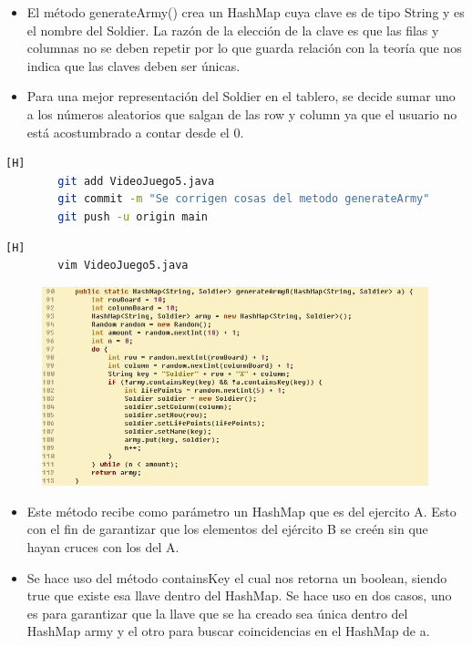 \documentclass{article}
\begin{document}
	\begin{itemize}	
		\item El método generateArmy()  crea un HashMap cuya clave es de tipo String y es el nombre del Soldier. La razón de la elección de la clave es que las filas y columnas no se deben repetir por lo que guarda relación con la teoría que nos indica que las claves deben ser únicas.
		\item Para una mejor representación del Soldier en el tablero, se decide sumar uno a los números aleatorios que salgan de las row y column ya que el usuario no está acostumbrado a contar desde el 0.
	\end{itemize}
	
	
	\begin{lstlisting}[language=bash,caption={Commit: 0c0b73fb81d0a4ced7ff7998e9ed8dc40ac99f17}][H]
		git add VideoJuego5.java
		git commit -m "Se corrigen cosas del metodo generateArmy"			
		git push -u origin main
	\end{lstlisting}
	
	\begin{lstlisting}[language=bash,caption={Se modifica el método que genera un HashMap para el ejército B  }][H]
		vim VideoJuego5.java
	\end{lstlisting}
	
		\begin{figure}[H]
		\centering
		\includegraphics[width=1\textwidth,keepaspectratio]{img/generateArmyB.jpg}
	\end{figure}
	
	\begin{itemize}	
		\item Este método recibe como parámetro un HashMap que es del ejercito A. Esto con el fin de garantizar que los elementos del ejército B se creén sin que hayan cruces con los del A.
		\item Se hace uso del método containsKey el cual nos retorna un boolean, siendo true que existe esa llave dentro del HashMap. Se hace uso en dos casos, uno es para garantizar que la llave que se ha creado sea única dentro del HashMap army y el otro para buscar coincidencias en el HashMap de a.
	\end{itemize}
\end{document}
